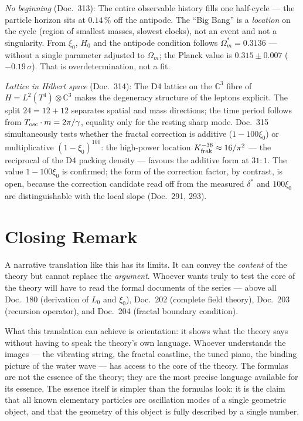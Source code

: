 \emph{No beginning} (Doc.~313): The entire observable history fills one
half-cycle --- the particle horizon sits at $0.14\,\%$ off the antipode.
The \enquote{Big Bang} is a \emph{location} on the cycle (region of
smallest masses, slowest clocks), not an event and not a singularity.
From $\xi_0$, $H_0$ and the antipode condition follows
$\Omega_m^* = 0.3136$ --- without a single parameter adjusted to
$\Omega_m$; the Planck value is $0.315 \pm 0.007$ ($-0.19\,\sigma$).
That is overdetermination, not a fit.

\emph{Lattice in Hilbert space} (Doc.~314): The D4 lattice on the
$\mathbb{C}^3$ fibre of $H = L^2(T^4) \otimes \mathbb{C}^3$ makes the
degeneracy structure of the leptons explicit. The split $24 = 12 + 12$
separates spatial and mass directions; the time period follows from
$T_{\rm osc}\cdot m = 2\pi/\gamma$, equality only for the resting
sharp mode. Doc.~315 simultaneously tests whether the fractal
correction is additive ($1-100\xi_0$) or multiplicative
$(1-\xi_0)^{100}$: the high-power location $K_{\rm frak}^{-36}
\approx 16/\pi^2$ --- the reciprocal of the D4 packing density ---
favours the additive form at $31:1$. The value $1-100\xi_0$ is
confirmed; the form of the correction factor, by contrast, is open,
because the correction candidate read off from the measured $\delta^*$
and $100\xi_0$ are distinguishable with the local slope (Doc.~291, 293).

\section{Closing Remark}

A narrative translation like this has its limits. It can convey
the \emph{content} of the theory but cannot replace the
\emph{argument}. Whoever wants truly to test the core of the
theory will have to read the formal documents of the series ---
above all Doc.~180 (derivation of $L_0$ and $\xi_0$), Doc.~202
(complete field theory), Doc.~203 (recursion operator), and
Doc.~204 (fractal boundary condition).

What this translation can achieve is orientation: it shows what
the theory says without having to speak the theory's own language.
Whoever understands the images --- the vibrating string, the
fractal coastline, the tuned piano, the binding picture of the
water wave --- has access to the core of the theory. The formulas
are not the essence of the theory; they are the most precise
language available for its essence. The essence itself is simpler
than the formulas look: it is the claim that all known elementary
particles are oscillation modes of a single geometric object, and
that the geometry of this object is fully described by a single
number.

